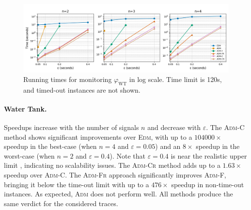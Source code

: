 


\begin{figure}[t]
	\begin{center}
		\includegraphics[width=\linewidth]{wt_newnames.png}
		\caption{Running times for monitoring $\varphi_{\text{WT}}$ in log scale. Time limit is 120s, and timed-out instances are not shown.}
	\end{center}
\end{figure}

\paragraph*{Water Tank.}
Speedups increase with the number of signals \(n\) and decrease with \(\varepsilon\).
The \textsc{Adm-C} method shows significant improvements over \textsc{Edm}, with up to a $104000\times$ speedup in the best-case (when \(n=4\) and \(\varepsilon=0.05\)) and an $8\times$ speedup in the worst-case (when \(n=2\) and \(\varepsilon=0.4\)).
Note that \(\varepsilon=0.4\) is near the realistic upper limit \cite{MomtazAB23}, indicating no scalability issues.
The \textsc{Adm-Cr} method adds up to a $1.63\times$ speedup over \textsc{Adm-C}.
The \textsc{Adm-Fr} approach significantly improves \textsc{Adm-F}, bringing it below the time-out limit with up to a $476\times$ speedup in non-time-out instances.
As expected, \textsc{Adm} does not perform well.
All methods produce the same verdict for the considered traces.

